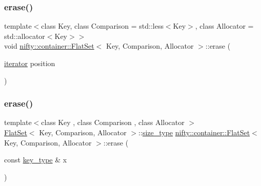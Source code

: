 \mbox{\label{classnifty_1_1container_1_1FlatSet_aaccabadd6ed0c654095a2c0b03f0a9f3}} 
\subsubsection{\texorpdfstring{erase()}{erase()}\hspace{0.1cm}{\footnotesize\ttfamily [1/3]}}
{\footnotesize\ttfamily template$<$class Key, class Comparison = std\+::less$<$\+Key$>$, class Allocator = std\+::allocator$<$\+Key$>$$>$ \\
void \hyperlink{classnifty_1_1container_1_1FlatSet}{nifty\+::container\+::\+Flat\+Set}$<$ Key, Comparison, Allocator $>$\+::erase (\begin{DoxyParamCaption}\item[{\hyperlink{classnifty_1_1container_1_1FlatSet_a9c7fd20cd6b1878ccb8a7e068072c795}{iterator}}]{position }\end{DoxyParamCaption})}

\mbox{\label{classnifty_1_1container_1_1FlatSet_af6e5ab750891cff2f2accc1b2b5f075e}} 
\subsubsection{\texorpdfstring{erase()}{erase()}\hspace{0.1cm}{\footnotesize\ttfamily [2/3]}}
{\footnotesize\ttfamily template$<$class Key , class Comparison , class Allocator $>$ \\
\hyperlink{classnifty_1_1container_1_1FlatSet}{Flat\+Set}$<$ Key, Comparison, Allocator $>$\+::\hyperlink{classnifty_1_1container_1_1FlatSet_a06ddeba4c1be37279497ed698dfeb812}{size\+\_\+type} \hyperlink{classnifty_1_1container_1_1FlatSet}{nifty\+::container\+::\+Flat\+Set}$<$ Key, Comparison, Allocator $>$\+::erase (\begin{DoxyParamCaption}\item[{const \hyperlink{classnifty_1_1container_1_1FlatSet_a0101a4574052389646be8d9bf092a949}{key\+\_\+type} \&}]{x }\end{DoxyParamCaption})\hspace{0.3cm}{\ttfamily [inline]}}

